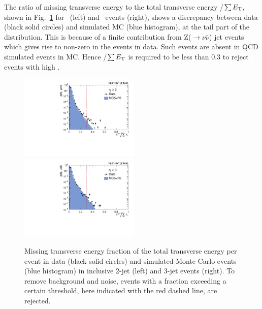 The ratio of missing transverse energy to the total transverse energy \ETmiss/$\sum E_{\mathrm{T}}$, shown in Fig.~\ref{fig:metcut} for \njt~(left) and \njth~events (right), shows a discrepancy between data (black solid circles) and simulated MC (blue histogram), at the tail part of the distribution. This is because of a finite contribution from Z($\rightarrow \nu \bar{\nu}$) \plus jet events which gives rise to non-zero \ET in the events in data. Such events are absent in QCD simulated events in MC. Hence \ETmiss/$\sum E_{\mathrm{T}}$ is required to be less than 0.3 to reject events with high \ETmiss.

\begin{figure}[!htbp]
\centering
 \hspace*{-2mm}\includegraphics[width=0.51\textwidth]{Plots_HT_2_150/Missing_ET_2.pdf}%
 ~~\includegraphics[width=0.51\textwidth]{Plots_HT_2_150/Missing_ET_3.pdf}
 \caption[Missing transverse energy distribution.]{Missing transverse energy fraction of the total transverse energy per event in data (black solid circles) and simulated Monte Carlo events (blue histogram) in inclusive 2-jet (left) and 3-jet events (right). To remove background and noise, events with a fraction exceeding a certain threshold, here indicated with the red dashed line, are rejected.}
 \label{fig:metcut}
\end{figure} 

